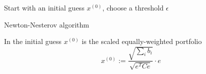 \begin{algorithm}
Start with an initial guess $x^{(0)}$, choose a threshold $\epsilon$\\
\caption{Newton-Nesterov algorithm}
\label{alg:nesterov}
\end{algorithm}

In \cite{spinu} the initial guess $x^{(0)}$ is the scaled equally-weighted portfolio
\begin{equation}
x^{(0)} := \frac{\sqrt{\sum_i b_i}}{\sqrt{e^T C e}} \cdot e
\end{equation}

